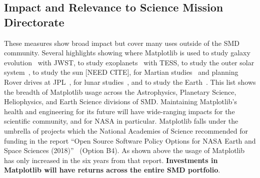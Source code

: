 \documentclass[12pt]{article}
\numberwithin{page}{section}
\begin{document}


%
%
%





\subsection{Impact and Relevance to Science Mission Directorate}



These measures show broad impact but cover many uses outside of the
SMD community.  Several highlights showing where Matplotlib is used
to study galaxy evolution~\cite{2022ApJ...940L..14N} with JWST,
to study exoplanets~\cite{2020AJ....160..116G, Barclay_2018,2019AJ....158...27L} with TESS,
to study the outer solar system~\cite{Emran_2023},
to study the sun [NEED CITE],
for Martian studies~\cite{2022JE007697} and planning Rover drives at JPL~\cite{acurtis},
for lunar studies~\cite{NESNAS2023163},
and to study the Earth~\cite{paolo_2024}.
This list shows the breadth of Matplotlib usage across the Astrophysics,
Planetary Science, Heliophysics, and Earth Science divisions of SMD.
Maintaining Matplotlib's health and engineering for its future will
have wide-ranging impacts for the scientific community, and for NASA in
particular.
Matplotlib falls under the umbrella of projects which the National Academies of
Science recommended for funding in the report ``Open Source Software Policy
Options for NASA Earth and Space Sciences (2018)''~\cite{NAP25217} (Option B4).
As shown above the usage of Matplotlib has only increased in the six years from
that report.  \textbf{Investments in Matplotlib will have returns across the
  entire SMD portfolio}.
\end{document}
